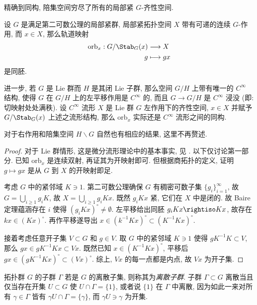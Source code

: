 精确到同构, 陪集空间穷尽了所有的局部紧 $G$-齐性空间.
\begin{theorem}\label{prop:homogeneous-space}
	设 $G$ 是满足第二可数公理的局部紧群, 局部紧拓扑空间 $X$ 带有可递的连续 $G$-作用, 而 $x \in X$, 那么轨道映射
	\begin{align*}
		\mathrm{orb}_x: G/\Stab_G(x) & \longrightarrow X \\
			g & \longmapsto gx
	\end{align*}
	是同胚.

	进一步, 若 $G$ 是 Lie 群而 $H$ 是其闭 Lie 子群, 那么空间 $G/H$ 上带有唯一的 $C^\infty$ 结构, 使得 $G$ 在 $G/H$ 上的左平移作用是 $C^\infty$ 的, 而且 $G \to G/H$ 是 $C^\infty$ 浸没 (即: 切映射处处满秩). 设 $C^\infty$ 流形 $X$ 是 Lie 群 $G$ 左作用下的齐性空间, $x \in X$ 并赋予 $G/\Stab_G(x)$ 上述之流形结构, 那么 $\mathrm{orb}_x$ 实际还是 $C^\infty$ 流形之间的同构.
\end{theorem}

对于右作用和陪集空间 $H \backslash G$ 自然也有相应的结果, 这里不再赘述.
\begin{proof}
	对于 Lie 群情形, 这是微分流形理论中的基本事实, 见 \cite[Theorem 21.17, Theorem 21.18]{Lee13}. 以下仅讨论第一部分. 已知 $\mathrm{orb}_x$ 是连续双射, 再证其为开映射即可. 但根据商拓扑的定义, 证明 $g \mapsto gx$ 是从 $G$ 到 $X$ 的开映射即足.
	
	考虑 $G$ 中的紧邻域 $K \ni 1$. 第二可数公理确保 $G$ 有稠密可数子集 $\{ g_i \}_{i=1}^\infty$, 故 $G = \bigcup_{i \geq 1} g_i K$, 故 $X = \bigcup_{i \geq 1} g_i K x$. 既然 $g_i K x$ 紧, 它们在 $X$ 中是闭的. 故 Baire 定理蕴涵存在 $i$ 使得 $(g_i K x)^\circ \neq \emptyset$. 左平移给出同胚 $g_i K x \rightiso Kx$, 故存在 $kx \in (Kx)^\circ$. 再作平移遂导出 $x \in (k^{-1} Kx)^\circ \subset (K^{-1} Kx)^\circ$.
	
	接着考虑任意开子集 $V \subset G$ 和 $g \in V$. 取 $G$ 中的紧邻域 $K \ni 1$ 使得 $gK^{-1}K \subset V$, 那么 $gx \in gK^{-1}Kx \subset Vx$. 既然已知 $x \in (K^{-1} Kx)^\circ$, 平移后 $gx \in (gK^{-1} Kx)^\circ \subset (Vx)^\circ$. 综上, $Vx$ 的每一点都是内点, 故 $Vx$ 为开子集.
\end{proof}


拓扑群 $G$ 的子群 $\Gamma$ 若是 $G$ 的离散子集, 则称其为\emph{离散子群}. 子群 $\Gamma \subset G$ 离散当且仅当存在开集 $U \subset G$ 使 $U \cap \Gamma = \{1\}$, 或者说 $\{1\}$ 在 $\Gamma$ 中离散, 因为如此一来对所有 $\gamma \in \Gamma$ 皆有 $\gamma U \cap \Gamma = \{\gamma\}$, 而 $\gamma U \ni \gamma$ 为开集. 

